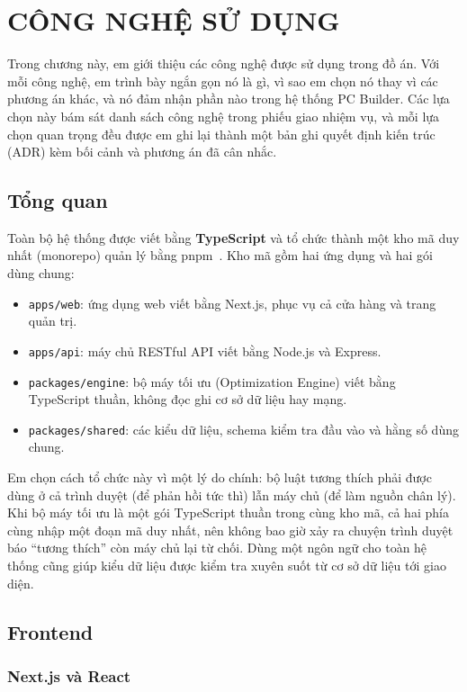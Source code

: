 \chapter{CÔNG NGHỆ SỬ DỤNG}
\label{chap:cong-nghe}

Trong chương này, em giới thiệu các công nghệ được sử dụng trong đồ án. Với mỗi công nghệ, em trình bày ngắn gọn nó là gì, vì sao em chọn nó thay vì các phương án khác, và nó đảm nhận phần nào trong hệ thống PC Builder. Các lựa chọn này bám sát danh sách công nghệ trong phiếu giao nhiệm vụ, và mỗi lựa chọn quan trọng đều được em ghi lại thành một bản ghi quyết định kiến trúc (ADR) kèm bối cảnh và phương án đã cân nhắc.

\section{Tổng quan}

Toàn bộ hệ thống được viết bằng \textbf{TypeScript} và tổ chức thành một kho mã duy nhất (monorepo) quản lý bằng pnpm~\cite{pnpm}. Kho mã gồm hai ứng dụng và hai gói dùng chung:
\begin{itemize}
  \item \texttt{apps/web}: ứng dụng web viết bằng Next.js, phục vụ cả cửa hàng và trang quản trị.
  \item \texttt{apps/api}: máy chủ RESTful API viết bằng Node.js và Express.
  \item \texttt{packages/engine}: bộ máy tối ưu (Optimization Engine) viết bằng TypeScript thuần, không đọc ghi cơ sở dữ liệu hay mạng.
  \item \texttt{packages/shared}: các kiểu dữ liệu, schema kiểm tra đầu vào và hằng số dùng chung.
\end{itemize}

Em chọn cách tổ chức này vì một lý do chính: bộ luật tương thích phải được dùng ở cả trình duyệt (để phản hồi tức thì) lẫn máy chủ (để làm nguồn chân lý). Khi bộ máy tối ưu là một gói TypeScript thuần trong cùng kho mã, cả hai phía cùng nhập một đoạn mã duy nhất, nên không bao giờ xảy ra chuyện trình duyệt báo ``tương thích'' còn máy chủ lại từ chối. Dùng một ngôn ngữ cho toàn hệ thống cũng giúp kiểu dữ liệu được kiểm tra xuyên suốt từ cơ sở dữ liệu tới giao diện.

\section{Frontend}

\subsection{Next.js và React}

